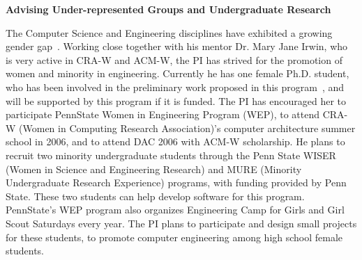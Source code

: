 \item{\bf Advising Under-represented Groups and Undergraduate
Research}

The Computer Science and Engineering disciplines have exhibited a
growing gender gap~\cite{es:women-engineer1,es:women-engineer2}.
Working close together with his mentor Dr. Mary Jane Irwin, who is
very active in CRA-W and ACM-W, the PI has strived for the
promotion of women and minority in engineering. Currently he has
one female Ph.D. student, who has been involved in the preliminary
work proposed in this program~\cite{xie:iccad06}, and will be
supported by this program if it is funded. The PI has encouraged
her to participate PennState Women in Engineering Program (WEP),
to attend CRA-W (Women in Computing Research Association)'s
computer architecture summer school in 2006, and to attend DAC
2006 with ACM-W scholarship.  He plans to recruit two minority
undergraduate students through the Penn State WISER (Women in
Science and Engineering Research) and MURE (Minority Undergraduate
Research Experience) programs, with funding provided by Penn
State. These two students can help develop software for this
program. PennState's WEP program also organizes Engineering Camp
for Girls and Girl Scout Saturdays every year. The PI plans to
participate and design small projects for these students, to
promote computer engineering among high school female students.


 \squishend







